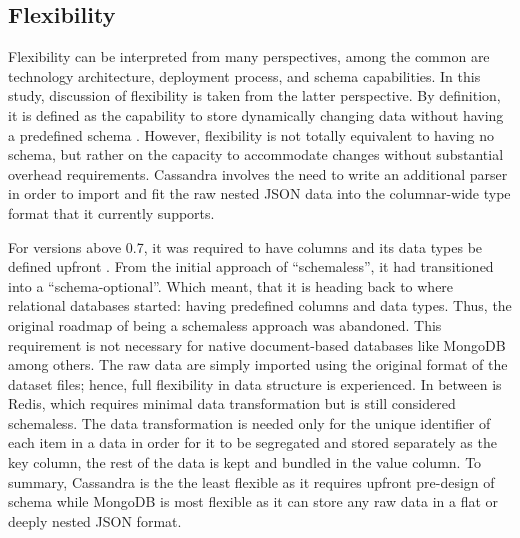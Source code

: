 \documentclass[5p]{elsarticle}
\begin{document}
\begin{figure}[h]
{           \label{performance.workloadc}
         }
\end{figure}




\subsection{Flexibility}
Flexibility can be interpreted from many perspectives, among the common are technology architecture, deployment process, and schema capabilities. 
In this study, discussion of flexibility is taken from the latter perspective. 
By definition, it is defined as the capability to store dynamically changing data without having a predefined schema \cite{O.Schmitt20121,Z.Goli-Malekabadi201675}. 
However, flexibility is not totally equivalent to having no schema, but rather on the capacity to accommodate changes without substantial overhead requirements. 
Cassandra involves the need to write an additional parser in order to import and fit the raw nested JSON data into the columnar-wide type format that it currently supports.

For versions above 0.7, it was required to have columns and its data types be defined upfront \cite{J.Ellis2018}. From the initial approach of “schemaless”, 
it had transitioned into a “schema-optional”. Which meant, that it is heading back to where relational databases started: having predefined columns and data types. 
Thus, the original roadmap of being a schemaless approach was abandoned. This requirement is not necessary for native document-based databases like MongoDB among others. 
The raw data are simply imported using the original format of the dataset files; hence, full flexibility in data structure is experienced. 
In between is Redis, which requires minimal data transformation but is still considered schemaless. 
The data transformation is needed only for the unique identifier of each item in a data in order for it to be segregated and stored separately as the key column,
the rest of the data is kept and bundled in the value column. 
To summary, Cassandra is the the least flexible as it requires upfront pre-design of schema while MongoDB is most flexible as it can store any raw data in a flat or deeply nested JSON format.
\end{document}
